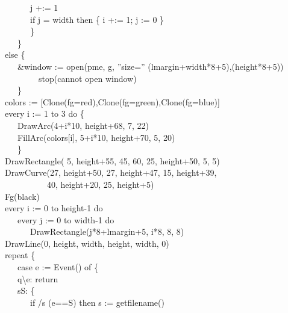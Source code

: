 {\>   \ \ \ \ \ \ j +:= 1 \\
\>   \ \ \ \ \ \ if j = width then \{ i +:= 1; j := 0 \} \\
\>   \ \ \ \ \ \ \} \\
\>   \ \ \ \} \\
\>   else \{ \\
\>   \ \ \ \&window := open({\textquotedbl}pme{\textquotedbl},
{\textquotedbl}g{\textquotedbl},
{\textquotedblright}size={\textquotedblright} {\textbar}{\textbar}
(lmargin+width*8+5){\textbar}{\textbar}{\textquotedbl},{\textquotedbl}{\textbar}{\textbar}(height*8+5))
{\textbar} \\
 \ \ \ \ \ \ \ \ stop({\textquotedbl}cannot open window{\textquotedbl}) \\
\>   \ \ \ \} \\
\>   colors :=
[Clone({\textquotedbl}fg=red{\textquotedbl}),Clone({\textquotedbl}fg=green{\textquotedbl}),Clone({\textquotedbl}fg=blue{\textquotedbl})] \\
\>   every i := 1 to 3 do \{ \\
\>   \ \ \ DrawArc(4+i*10, height+68, 7, 22) \\
\>   \ \ \ FillArc(colors[i], 5+i*10, height+70, 5, 20) \\
\>   \ \ \ \} \\
\>   DrawRectangle( 5, height+55, 45, 60, 25, height+50, 5, 5) \\
\>   DrawCurve(27, height+50, 27, height+47, 15, height+39, \\
\>   \ \ \ \ \ \ \ \ \ \ 40, height+20, 25, height+5) \\
\>   Fg({\textquotedbl}black{\textquotedbl}) \\
\>   every i := 0 to height-1 do \\
\>   \ \ \ every j := 0 to width-1 do \\
\>   \ \ \ \ \ \ DrawRectangle(j*8+lmargin+5, i*8, 8, 8) \\
\>   DrawLine(0, height, width, height, width, 0) \\
\>   repeat \{ \\
\>   \ \ \ case e := Event() of \{ \\
\>   \ \ \ {\textquotedbl}q{\textquotedbl}{\textbar}{\textquotedbl}{\textbackslash}e{\textquotedbl}:
return \\
\>   \ \ \ {\textquotedbl}s{\textquotedbl}{\textbar}{\textquotedbl}S{\textquotedbl}:
\{ \\
\>   \ \ \ \ \ \ if /s {\textbar} (e=={\textquotedbl}S{\textquotedbl})
then s := getfilename() \\
}
